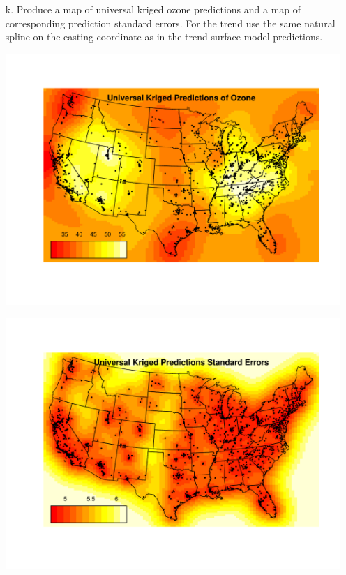 \documentclass[letterpaper, 12pt]{article}\usepackage[]{graphicx}\usepackage[]{color}
\makeatletter
\def\maxwidth{ %
  \ifdim\Gin@nat@width>\linewidth
    \linewidth
  \else
    \Gin@nat@width
  \fi
}
\newenvironment{knitrout}{}{} %
\makeatother
\begin{document}
\begin{enumerate}
\begin{knitrout}
\end{knitrout}


\item[k.]
Produce a map of universal kriged ozone predictions and a map of corresponding prediction standard errors. For the trend use the same natural spline on the easting coordinate as in the trend surface model predictions.

\begin{knitrout}
\color{fgcolor}
\includegraphics[width=\maxwidth]{figure/uk} 

\end{knitrout}


\begin{knitrout}
\color{fgcolor}
\includegraphics[width=\maxwidth]{figure/ukresid} 


\end{knitrout}
\end{enumerate}
\end{document}
